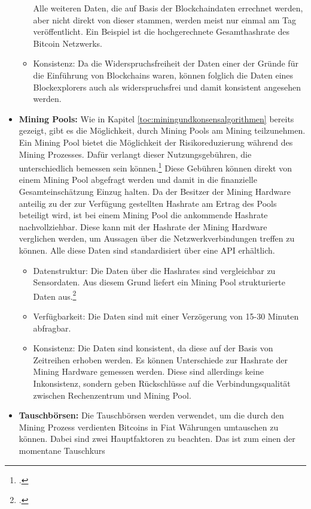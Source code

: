 \begin{itemize}
\begin{itemize}
        Alle weiteren Daten, die auf Basis der Blockchaindaten errechnet werden, aber nicht direkt von dieser stammen, werden
        meist nur einmal am Tag veröffentlicht. Ein Beispiel ist die hochgerechnete Gesamthashrate des Bitcoin Netzwerks.
        \item Konsistenz: Da die Widerspruchsfreiheit der Daten einer der Gründe für die Einführung von Blockchains waren,
        können folglich die Daten eines Blockexplorers auch als widerspruchsfrei und damit konsistent angesehen werden. 
    \end{itemize}
    \item \textbf{Mining Pools: }Wie in Kapitel \ref{toc:miningundkonsensalgorithmen} bereits gezeigt, gibt es die
    Möglichkeit, durch Mining Pools am Mining teilzunehmen. Ein Mining Pool bietet die Möglichkeit der Risikoreduzierung
    während des Mining Prozesses. Dafür verlangt dieser Nutzungsgebühren, die unterschiedlich bemessen sein
    können.\footcite[Cf.][pp. 59]{bhaskar2015bitcoin} Diese Gebühren können direkt von einem Mining Pool abgefragt werden
    und damit in die finanzielle Gesamteinschätzung Einzug halten. Da der Besitzer der Mining Hardware anteilig
    zu der zur Verfügung gestellten Hashrate am Ertrag des Pools beteiligt wird, ist bei einem Mining Pool die ankommende
    Hashrate nachvollziehbar. Diese kann mit der Hashrate der Mining Hardware verglichen werden, um Aussagen über die
    Netzwerkverbindungen treffen zu können. Alle diese Daten sind standardisiert über eine \ac{API} erhältlich.
    \begin{itemize}
        \item Datenstruktur: Die Daten über die Hashrates sind vergleichbar zu Sensordaten. Aus diesem Grund liefert ein
        Mining Pool strukturierte Daten aus.\footcite[Cf.][p. 27]{kimble2015big}
        \item Verfügbarkeit: Die Daten sind mit einer Verzögerung von 15-30 Minuten abfragbar.
        \item Konsistenz: Die Daten sind konsistent, da diese auf der Basis von Zeitreihen erhoben werden. Es können
        Unterschiede zur Hashrate der Mining Hardware gemessen werden. Diese sind allerdings keine Inkonsistenz, sondern
        geben Rückschlüsse auf die Verbindungsqualität zwischen Rechenzentrum und Mining Pool.
    \end{itemize}
    \item \textbf{Tauschbörsen: }Die Tauschbörsen werden verwendet, um die durch den Mining Prozess verdienten Bitcoins in
    Fiat Währungen umtauschen zu können. Dabei sind zwei Hauptfaktoren zu beachten. Das ist zum einen der momentane Tauschkurs

\end{itemize}
